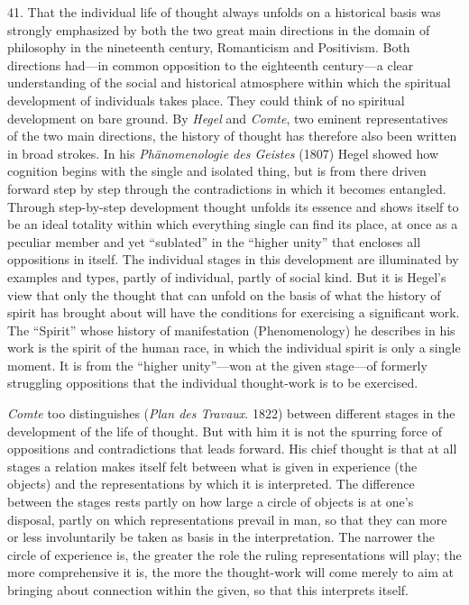 \documentclass[12pt,a4paper]{book}
\newcommand{\opage}[1]{\marginnote{\footnotesize\textit{[#1]}}}
\begin{document}
41. That the individual life of thought always unfolds on a historical
basis was strongly emphasized by both the two great main directions in the
domain of philosophy in the nineteenth century, Romanticism and Positivism.
Both directions had---in common opposition to the eighteenth
century---a clear understanding of the social and historical atmosphere
within which the spiritual development of individuals takes place. They
could think of no spiritual development on bare ground. By \emph{Hegel} and
\emph{Comte}, two eminent representatives of the two main directions, the
history of thought has therefore also been written in broad strokes. In his
\emph{Phänomenologie des Geistes} (1807) Hegel showed how cognition begins
with the single and isolated thing, but is from there driven forward step
by step through the contradictions in which it becomes entangled. Through
step-by-step development thought unfolds its essence and shows itself to be
an ideal totality within which everything single can find its place, at
once as a peculiar member and yet ``sublated'' in the ``higher unity'' that
encloses all oppositions in itself. The \opage{112}individual stages in this
development are illuminated by examples and types, partly of individual,
partly of social kind. But it is Hegel's view that only the thought that
can unfold on the basis of what the history of spirit has brought about
will have the conditions for exercising a significant work. The ``Spirit''
whose history of manifestation (Phenomenology) he describes in his work is
the spirit of the human race, in which the individual spirit is only a
single moment. It is from the ``higher unity''---won at the given
stage---of formerly struggling oppositions that the individual thought-work
is to be exercised.

\emph{Comte} too distinguishes (\emph{Plan des Travaux}. 1822) between
different stages in the development of the life of thought. But with him it
is not the spurring force of oppositions and contradictions that leads
forward. His chief thought is that at all stages a relation makes itself
felt between what is given in experience (the objects) and the
representations by which it is interpreted. The difference between the
stages rests partly on how large a circle of objects is at one's disposal,
partly on which representations prevail in man, so that they can more or
less involuntarily be taken as basis in the interpretation. The narrower
the circle of experience is, the greater the role the ruling
representations will play; the more comprehensive it is, the more the
thought-work will come merely to aim at bringing about connection within
the given, so that this interprets itself.
\end{document}
